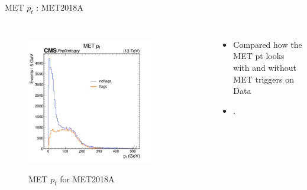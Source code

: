 \documentclass[10pt,xcolor=dvipsnames,aspectratio=169]{beamer}
\begin{document}
  \begin{frame}[fragile]{MET $p_t$ : MET2018A} 
  \begin{columns}
  \begin{figure} 
  \centering 
   \includegraphics[width=0.8\textwidth]{../Archive/KinemPlots/DataptMETflags.png }
  \label{METDataflagpt} 
  \caption{MET $p_t$ for MET2018A}
  \end{figure} 
  \begin{itemize} 
  \raggedright 
  \small
  \item Compared how the MET pt looks with and without MET triggers on Data
  \item .
  \end{itemize}
  \end{columns} 
  \end{frame}
\end{document}
